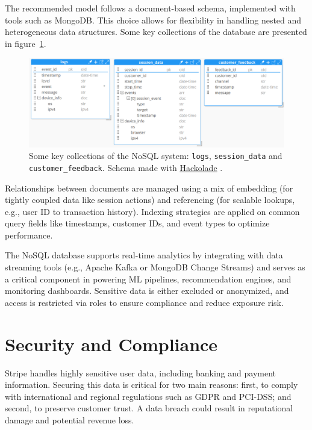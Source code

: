 \documentclass[11pt,a4paper,computermodern]{article}
\newcommand{\code}{\texttt}
\begin{document}
The recommended model follows a document-based schema, implemented with tools such as MongoDB. This choice allows for flexibility in handling nested and heterogeneous data structures. Some key collections of the database are presented in figure~\ref{fig:NoSQL}.

\begin{figure}[!htb]
	\centering
	\includegraphics[scale=0.66]{./figures/NoSQL}
	\caption{Some key collections of the NoSQL system: \code{logs}, \code{session\_data} and \code{customer\_feedback}. Schema made with \href{https://hackolade.com/}{Hackolade} .}
	\label{fig:NoSQL}
\end{figure}


Relationships between documents are managed using a mix of embedding (for tightly coupled data like session actions) and referencing (for scalable lookups, e.g., user ID to transaction history). Indexing strategies are applied on common query fields like timestamps, customer IDs, and event types to optimize performance.

The NoSQL database supports real-time analytics by integrating with data streaming tools (e.g., Apache Kafka or MongoDB Change Streams) and serves as a critical component in powering ML pipelines, recommendation engines, and monitoring dashboards. Sensitive data is either excluded or anonymized, and access is restricted via roles to ensure compliance and reduce exposure risk.


\clearpage
\section*{Security and Compliance}

Stripe handles highly sensitive user data, including banking and payment information. Securing this data is critical for two main reasons: first, to comply with international and regional regulations such as GDPR and PCI-DSS; and second, to preserve customer trust. A data breach could result in reputational damage and potential revenue loss.
\end{document}
